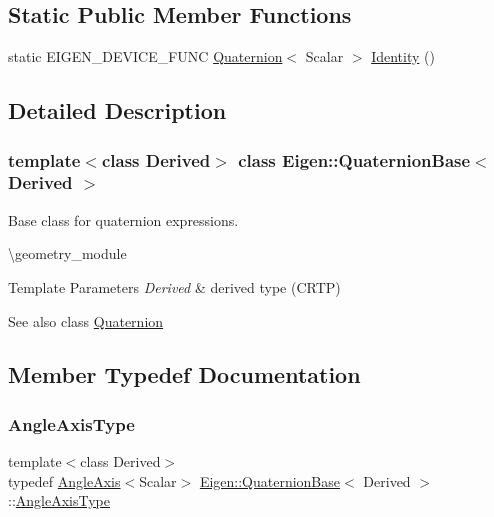 \subsection*{Static Public Member Functions}
\begin{DoxyCompactItemize}
\item 
static E\+I\+G\+E\+N\+\_\+\+D\+E\+V\+I\+C\+E\+\_\+\+F\+U\+NC \mbox{\hyperlink{class_eigen_1_1_quaternion}{Quaternion}}$<$ Scalar $>$ \mbox{\hyperlink{class_eigen_1_1_quaternion_base_a2e095881344a2538041df4fea938b2e0}{Identity}} ()
\end{DoxyCompactItemize}


\subsection{Detailed Description}
\subsubsection*{template$<$class Derived$>$\newline
class Eigen\+::\+Quaternion\+Base$<$ Derived $>$}

Base class for quaternion expressions. 

\textbackslash{}geometry\+\_\+module


\begin{DoxyTemplParams}{Template Parameters}
{\em Derived} & derived type (C\+R\+TP) \\
\hline
\end{DoxyTemplParams}
\begin{DoxySeeAlso}{See also}
class \mbox{\hyperlink{class_eigen_1_1_quaternion}{Quaternion}} 
\end{DoxySeeAlso}


\subsection{Member Typedef Documentation}
\mbox{\label{class_eigen_1_1_quaternion_base_aed266c63b10a4028304901d9c8614199}} 
\subsubsection{\texorpdfstring{AngleAxisType}{AngleAxisType}}
{\footnotesize\ttfamily template$<$class Derived$>$ \\
typedef \mbox{\hyperlink{class_eigen_1_1_angle_axis}{Angle\+Axis}}$<$Scalar$>$ \mbox{\hyperlink{class_eigen_1_1_quaternion_base}{Eigen\+::\+Quaternion\+Base}}$<$ Derived $>$\+::\mbox{\hyperlink{class_eigen_1_1_quaternion_base_aed266c63b10a4028304901d9c8614199}{Angle\+Axis\+Type}}}

